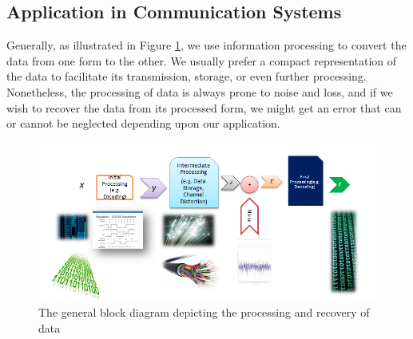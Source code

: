 \subsection{Application in Communication Systems}
Generally, as illustrated in Figure \ref{fig:comm_block}, we use information processing to convert the data from one form to the other. We usually prefer a compact representation of the data to facilitate its transmission, storage, or even further processing. Nonetheless, the processing of data is always prone to noise and loss, and if we wish to recover the data from its processed form, we might get an error that can or cannot be neglected depending upon our application.\\
\begin{figure}[htbp]
  \centering
  \includegraphics[width=\textwidth]{./Figures/comm_block.png}
  \caption{The general block diagram depicting the processing and recovery of data}
  \label{fig:comm_block}
\end{figure}

